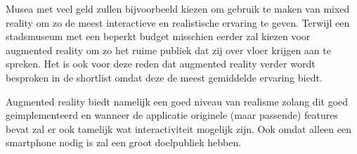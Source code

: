 Musea met veel geld zullen bijvoorbeeld kiezen om gebruik te maken van mixed reality om zo de meest interactieve en realistische ervaring te geven. Terwijl een stadsmuseum met een beperkt budget misschien eerder zal kiezen voor augmented reality om zo het ruime publiek dat zij over vloer krijgen aan te spreken. Het is ook voor deze reden dat augmented reality verder wordt besproken in de shortlist omdat deze de meest gemiddelde ervaring biedt.

Augmented reality biedt namelijk een goed niveau van realisme zolang dit goed geimplementeerd en wanneer de applicatie originele (maar passende) features bevat zal er ook tamelijk wat interactiviteit mogelijk zijn. Ook omdat alleen een smartphone nodig is zal een groot doelpubliek hebben.